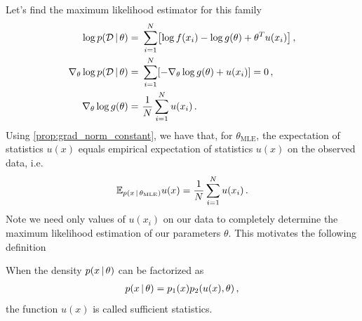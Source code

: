 Let's find the maximum likelihood estimator for this family
\begin{align}
    \log p(\mathcal{D}\cond \theta) =~& \sum_{i=1}^N \left[\log f(x_i) - \log g(\theta) + \theta^Tu(x_i)\right]\,,\\
    \nabla_\theta\log p(\mathcal{D}\cond \theta) =~& \sum_{i=1}^N \left[ - \nabla_\theta\log g(\theta) + u(x_i)\right] = 0\,,\\
    \nabla_\theta\log g(\theta) =~& \frac{1}{N}\sum_{i=1}^Nu(x_i)\,.
\end{align}
Using \cref{prop:grad_norm_constant}, we have that, for $\theta_{\text{MLE}}$, the expectation of statistics $u(x)$ equals empirical expectation of statistics $u(x)$ on the observed data, i.e.
\begin{align}
    \mathbb{E}_{p(x\,|\, \theta_{\text{MLE}})}u(x) = \frac{1}{N}\sum_{i=1}^Nu(x_i)\,.
\end{align}
Note we need only values of $u(x_i)$ on our data to completely determine the maximum likelihood estimation of our parameters $\theta$. This motivates the following definition
\begin{mybox}
\begin{definition}\label{def:suff_stats}
When the density $p(x\,|\, \theta)$ can be factorized as
\begin{align}
    p(x\,|\, \theta) = p_1(x)p_2(u(x),\theta)\,,
\end{align}
the function $u(x)$ is called sufficient statistics.
\end{definition}
\end{mybox}

